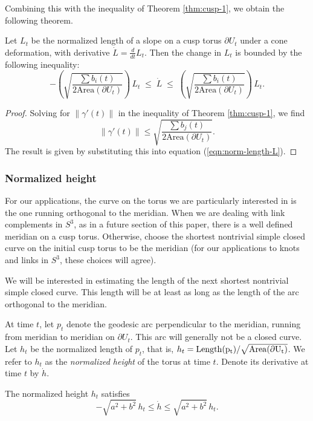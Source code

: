 Combining this with the inequality of Theorem \ref{thm:cusp-1},
we obtain the following theorem.

\begin{theorem}
  Let $L_t$ be the normalized length of a slope on a cusp torus
  $\partial U_t$ under a cone deformation, with derivative $\dot{L} =
  \frac{d}{dt} L_t$.  Then the change in $L_t$ is bounded by the
  following inequality:
  $$
  -\left(\sqrt{\frac{\sum b_i(t)}{2\mbox{Area}(\partial
        U_t)}}\right) \, L_t
	\;\leq\; \dot{L} \;\leq\;
  \left(\sqrt{\frac{\sum b_i(t)}{2\mbox{Area}(\partial U_t)}}\right)\,
  L_t.
  $$
\label{thm:norm-length-1}
\end{theorem}

\begin{proof}
  Solving for $\|\gamma'(t)\|$ in the inequality of Theorem
  \ref{thm:cusp-1}, we find
  $$\|\gamma'(t)\| \leq \sqrt{\frac{\sum b_j(t)}{2\mbox{Area}(\partial
      U_t)}}.$$
  The result is given by substituting this into equation
  (\ref{eqn:norm-length-L}).
\end{proof}


\subsubsection{Normalized height}

For our applications, the curve on the torus we are particularly
interested in is the one running orthogonal to the meridian.  When we
are dealing with link complements in $S^3$, as in a future section of
this paper, there is a well defined meridian on a cusp torus.
Otherwise, choose the shortest nontrivial simple closed curve on the
initial cusp torus to be the meridian (for our applications to knots
and links in $S^3$, these choices will agree).

We will be interested in estimating the length of the next shortest
nontrivial simple closed curve.  This length will be at least as long
as the length of the arc orthogonal to the meridian.  

At time $t$, let $p_t$ denote the geodesic arc perpendicular to the
meridian, running from meridian to meridian on $\partial U_t$.  This
arc will generally not be a closed curve.  Let $h_t$ be the normalized
length of $p_t$, that is, $h_t =
\rm{Length}(p_t)/\sqrt{\rm{Area}(\partial U_t)}$.  We refer to $h_t$
as the \emph{normalized height} of the torus at time $t$.  Denote its
derivative at time $t$ by $\dot{h}$.

\begin{lemma}
The normalized height $h_t$ satisfies
$$ -\sqrt{a^2+b^2}\,h_t \leq \dot{h} \leq
\sqrt{a^2+b^2}\,h_t.$$
\label{lemma:hdot-bound}
\end{lemma}


